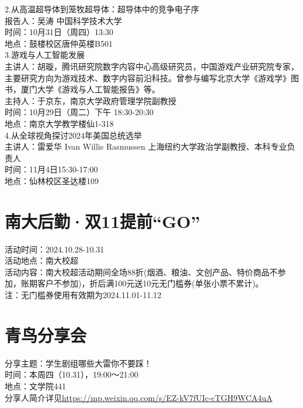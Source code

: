 \documentclass[letterpaper, 12pt]{article}
\begin{document}
\begin{multicols}{2}
2.从高温超导体到笼牧超导体：超导体中的竞争电子序\\
报告人：吴涛 中国科学技术大学\\
时间：10月31日（周四）13:30\\
地点：鼓楼校区唐仲英楼B501\\

3.游戏与人工智能发展\\
主讲人：胡璇，腾讯研究院数字内容中心高级研究员，中国游戏产业研究院专家，主要研究方向为游戏技术、数字内容前沿科技。曾参与编写北京大学《游戏学》图书，厦门大学《游戏与人工智能报告》等。\\
主持人：于京东，南京大学政府管理学院副教授\\
时间：10月29日（周二）下午 18:30-20:30\\
地点：南京大学教学楼仙1-318\\

4.从全球视角探讨2024年美国总统选举\\
主讲人：雷爱华 Ivan Willis Rasmussen 上海纽约大学政治学副教授、本科专业负责人\\
时间：11月4日15:30-17:00\\
地点：仙林校区圣达楼109\\

\section{南大后勤·双11提前“GO”}
活动时间：2024.10.28-10.31\\
活动地点：南大校超\\
活动内容：南大校超活动期间全场88折(烟酒、粮油、文创产品、特价商品不参加，账期客户不参加)，折后满100元送10元无门槛券(单张小票不累计)。\\
注：无门槛券使用有效期为2024.11.01-11.12

\section{青鸟分享会}
分享主题：学生剧组哪些大雷你不要踩！\\
时间：本周四（10.31），19:00～21:00\\
地点：文学院441\\
分享人简介详见\url{https://mp.weixin.qq.com/s/EZ-kV7fUIc-cTGH9WCA4uA}\\

\end{multicols}
\end{document}
